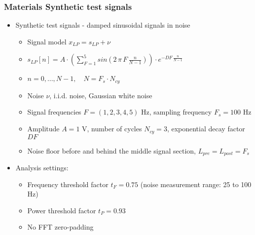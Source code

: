 \documentclass[11pt,aspectratio=169]{beamer}
\begin{document}
	\begin{frame}
		\frametitle{Materials \textendash{} Synthetic test signals}
		\begin{itemize}
			\item \textcolor{RIPtitlecol}{Synthetic test signals - damped sinusoidal signals in noise}
			\begin{itemize}
				\item Signal model $x_{LP} = s_{LP} + \nu$
				\item $s_{LP}[n] = A \cdot \left( \sum\limits_{F=1}^{5} sin(2\,\pi\,F\,\frac{n}{N-1}) \right) \cdot e^{-DF\,\frac{n}{N-1}}$
				\item $n = 0,\ldots,N-1, \quad N = F_s \cdot N_{cy}$
				\item Noise $\nu$, i.i.d. noise, Gaussian white noise
				\item Signal frequencies $F = (1, 2, 3, 4, 5)$ Hz, sampling frequency $F_s = 100$ Hz
				\item Amplitude $A = 1$ V, number of cycles $N_{cy} = 3$, exponential decay factor $DF$
				\item Noise floor before and behind the middle signal section, $L_{pre} = L_{post} = F_s$
			\end{itemize}
			\item \textcolor{RIPtitlecol}{Analysis settings:}
			\begin{itemize}
				\item Frequency threshold factor $t_F = 0.75$ (noise measurement range: 25 to 100 Hz)
				\item Power threshold factor $t_P = 0.93$
				\item No FFT zero-padding
			\end{itemize}
		\end{itemize}	
	\end{frame}
\end{document}
